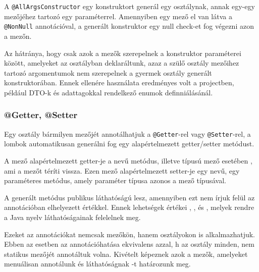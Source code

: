 A \lstinline|@AllArgsConstructor| egy konstruktort generál egy osztálynak, annak egy-egy mezőjéhez tartozó egy paraméterrel. Amennyiben egy mező el van látva a \lstinline|@NonNull| annotációval, a generált konstruktor egy null check-et fog végezni azon a mezőn.


Az  hátránya, hogy csak azok a mezők szerepelnek a konstruktor paraméterei között, amelyeket az osztályban deklaráltunk, azaz a szülő osztály mezőihez tartozó argomentumok nem szerepelnek a gyermek osztály generált konstruktorában. Ennek ellenére használata eredményes volt a projectben, például DTO-k és adattagokkal rendelkező enumok definniálásánál.


\subsubsection{@Getter, @Setter}

Egy osztály bármilyen mezőjét annotálhatjuk a  \lstinline|@Getter|-rel vagy \lstinline|@Setter|-rel, a lombok automatikusan generálni fog egy alapértelmezett getter/setter metódust. \par

A  mező alapértelmezett getter-je a  nevű metódus, illetve  típusú mező esetében , ami a  mezőt téríti vissza. Ezen mező alapértelmezett setter-je egy  nevű, egy paraméteres metódus, amely paraméter típusa azonos a mező típusával. \par

A generált metódus publikus láthatóságú lesz, amennyiben ezt nem írjuk felül az annotációban elhelyezett  értékkel. Ennek lehetségek értékei , ,  és , melyek rendre a Java nyelv láthatóságainak felelelnek meg. \par

Ezeket az annotációkat nemcsak mezőkön, hanem osztályokon is alkalmazhatjuk. Ebben az esetben az annotációhatása ekvivalens azzal, h az osztály minden, nem statikus mezőjét annotáltuk volna. Kivételt képeznek azok a mezők, amelyeket menuálisan annotálunk és láthatóságnak -t határozunk meg. \par


